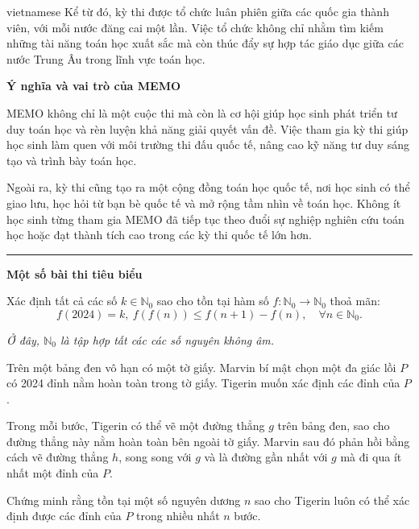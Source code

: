 \documentclass{article}
\begin{document}
\begin{otherlanguage*}{vietnamese}
Kể từ đó, kỳ thi được tổ chức luân phiên giữa các quốc gia thành viên, với mỗi nước đăng cai một lần.
Việc tổ chức không chỉ nhằm tìm kiếm những tài năng toán học xuất sắc mà còn thúc đẩy sự hợp tác giáo dục giữa các nước Trung Âu trong lĩnh vực toán học.

\textbf{Ý nghĩa và vai trò của MEMO}

MEMO không chỉ là một cuộc thi mà còn là cơ hội giúp học sinh phát triển tư duy toán học và rèn luyện khả năng giải quyết vấn đề.
Việc tham gia kỳ thi giúp học sinh làm quen với môi trường thi đấu quốc tế, nâng cao kỹ năng tư duy sáng tạo và trình bày toán học.

Ngoài ra, kỳ thi cũng tạo ra một cộng đồng toán học quốc tế, nơi học sinh có thể giao lưu, học hỏi từ bạn bè quốc tế và mở rộng tầm nhìn về toán học.
Không ít học sinh từng tham gia MEMO đã tiếp tục theo đuổi sự nghiệp nghiên cứu toán học hoặc đạt thành tích cao trong các kỳ thi quốc tế lớn hơn.

\bigbreak

\noindent\rule{16.5cm}{0.4pt}

\textbf{Một số bài thi tiêu biểu}

\bigbreak

\begin{problem*}
    Xác định tất cả các số \( k \in \mathbb{N}_0 \) sao cho tồn tại hàm số \( f: \mathbb{N}_0 \to \mathbb{N}_0 \) thoả mãn:
    \[
        f(2024) = k,\ f(f(n)) \leq f(n+1) - f(n), \quad \forall n \in \mathbb{N}_0.
    \]
   
    \textit{Ở đây, \( \mathbb{N}_0 \) là tập hợp tất các các số nguyên không âm.}
\end{problem*}

\begin{problem*}
    Trên một bảng đen vô hạn có một tờ giấy. Marvin bí mật chọn một đa giác lồi \( P \) có 2024 đỉnh nằm hoàn toàn trong tờ giấy. Tigerin muốn xác định các đỉnh của \( P \).  
    
    Trong mỗi bước, Tigerin có thể vẽ một đường thẳng \( g \) trên bảng đen, sao cho đường thẳng này nằm hoàn toàn bên ngoài tờ giấy.
    Marvin sau đó phản hồi bằng cách vẽ đường thẳng \( h \), song song với \( g \) và là đường gần nhất với \( g \) mà đi qua ít nhất một đỉnh của \( P \).  
    
    Chứng minh rằng tồn tại một số nguyên dương \( n \) sao cho Tigerin luôn có thể xác định được các đỉnh của \( P \) trong nhiều nhất \( n \) bước.
\end{problem*}


\end{otherlanguage*}
\end{document}
